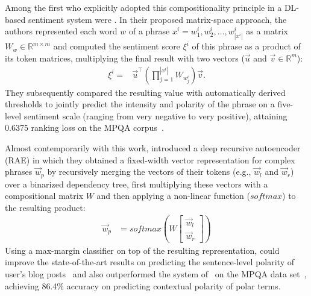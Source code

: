 Among the first who explicitly adopted this compositionality principle
in a DL-based sentiment system were \citet{Yessenalina:11}.  In their
proposed matrix-space approach, the authors represented each word $w$
of a phrase $x^i = w^i_1, w^i_2, \ldots, w^i_{|x^i|}$ as a matrix
$W_{w}\in\mathbb{R}^{m\times m}$ and computed the sentiment score
$\xi^i$ of this phrase as a product of its token matrices, multiplying
the final result with two vectors ($\vec{u}$ and
$\vec{v}\in\mathbb{R}^m$):
\begin{align*}
  \xi^i =& \vec{u}^\top\left(\prod_{j=1}^{|x^i|}W_{w^i_j}\right)\vec{v}.
\end{align*}
They subsequently compared the resulting value with automatically
derived thresholds to jointly predict the intensity and polarity of
the phrase on a five-level sentiment scale (ranging from very negative
to very positive), attaining 0.6375 ranking loss on the MPQA
corpus~\cite{Wiebe:05}. %

Almost contemporarily with this work, \citet{Socher:11} introduced a
deep recursive autoencoder (RAE) in which they obtained a fixed-width
vector representation for complex phrases $\vec{w}_p$ by recursively
merging the vectors of their tokens (e.g., $\vec{w}_l$ and
$\vec{w}_r$) over a binarized dependency tree, first multiplying these
vectors with a compositional matrix $W$ and then applying a non-linear
function ($softmax$) to the resulting product:
\begin{align}
  \vec{w}_p &= softmax\left(W\begin{bmatrix}
      \vec{w}_l\\
      \vec{w}_r
  \end{bmatrix}\right)\label{cgsa:eq:socher-11}
\end{align}
Using a max-margin classifier on top of the resulting representation,
\citet{Socher:11} could improve the state-of-the-art results on
predicting the sentence-level polarity of user's blog
posts~\cite{Potts:10} and also outperformed the system
of~\citet{Nasukawa:03} on the MPQA data set~\cite{Wiebe:05}, achieving
86.4\% accuracy on predicting contextual polarity of polar terms.

